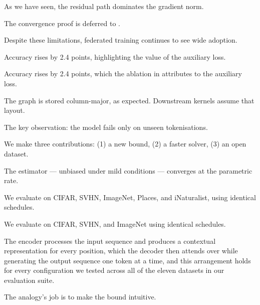 As we have seen, the residual path dominates the gradient norm.

The convergence proof is deferred to .

Despite these limitations, federated training continues to see wide adoption.

Accuracy rises by 2.4 points, highlighting the value of the auxiliary loss.

Accuracy rises by 2.4 points, which the ablation in  attributes to the auxiliary loss.

The graph is stored column-major, as expected. Downstream kernels assume that layout.

The key observation: the model fails only on unseen tokenisations.

We make three contributions: (1) a new bound, (2) a faster solver, (3) an open dataset.

The estimator --- unbiased under mild conditions --- converges at the parametric rate.

We evaluate on CIFAR, SVHN, ImageNet, Places, and iNaturalist, using identical schedules.

We evaluate on CIFAR, SVHN, and ImageNet using identical schedules.

The encoder processes the input sequence and produces a contextual representation for every position, which the decoder then attends over while generating the output sequence one token at a time, and this arrangement holds for every configuration we tested across all of the eleven datasets in our evaluation suite.

The analogy's job is to make the bound intuitive.

